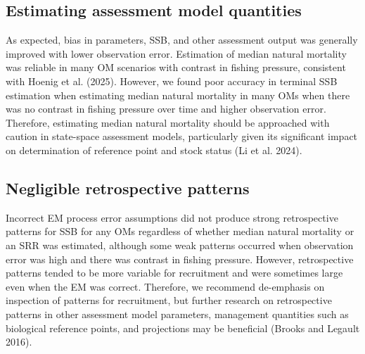 \documentclass[
  12pt,
]{article}
\begin{document}
\subsection*{Estimating assessment model
quantities}\label{estimating-assessment-model-quantities}

As expected, bias in parameters, SSB, and other assessment output was
generally improved with lower observation error. Estimation of median
natural mortality was reliable in many OM scenarios with contrast in
fishing pressure, consistent with Hoenig et al. (2025). However, we
found poor accuracy in terminal SSB estimation when estimating median
natural mortality in many OMs when there was no contrast in fishing
pressure over time and higher observation error. Therefore, estimating
median natural mortality should be approached with caution in
state-space assessment models, particularly given its significant impact
on determination of reference point and stock status (Li et al. 2024).

\subsection*{Negligible retrospective
patterns}\label{negligible-retrospective-patterns}

Incorrect EM process error assumptions did not produce strong
retrospective patterns for SSB for any OMs regardless of whether median
natural mortality or an SRR was estimated, although some weak patterns
occurred when observation error was high and there was contrast in
fishing pressure. However, retrospective patterns tended to be more
variable for recruitment and were sometimes large even when the EM was
correct. Therefore, we recommend de-emphasis on inspection of patterns
for recruitment, but further research on retrospective patterns in other
assessment model parameters, management quantities such as biological
reference points, and projections may be beneficial (Brooks and Legault
2016).
\end{document}
